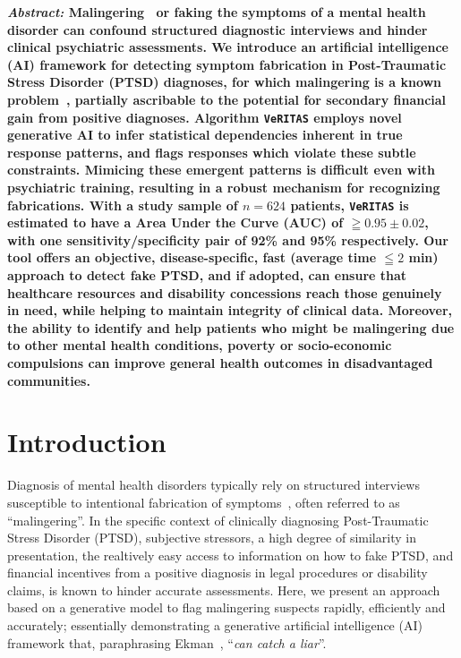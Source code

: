 \documentclass[onecolumn,10pt]{IEEEtran}
\def\vrts{\texttt{VeRITAS}\xspace}
\begin{document}
\maketitle


{\bf \sffamily \fontsize{10}{12}\selectfont \noindent   
  {\normalfont \itshape Abstract:} Malingering~\cite{Rogers1997,rogers2008clinical} or faking  the symptoms of a mental health disorder  can confound structured diagnostic interviews and hinder clinical psychiatric assessments.  We introduce an  artificial intelligence (AI) framework for detecting symptom fabrication in Post-Traumatic Stress Disorder (PTSD) diagnoses, for which malingering is a known problem~\cite{frueh2007us,taylor2007detection}, partially ascribable to the  potential for secondary financial gain from positive diagnoses.  Algorithm \vrts employs novel generative AI to infer statistical dependencies inherent in true response patterns, and flags  responses which violate these subtle  constraints. Mimicing these  emergent  patterns is difficult  even  with psychiatric training, resulting in a robust mechanism for recognizing fabrications. With a study sample of $n=624$ patients, \vrts is estimated to have a   Area Under the Curve (AUC) of $\geqq 0.95\pm 0.02$, with one sensitivity/specificity pair  of 92\% and 95\% respectively. Our tool   offers an  objective, disease-specific, fast (average time $\leqq 2$ min)  approach to detect fake  PTSD, and if adopted, can  ensure that healthcare resources and disability concessions reach  those genuinely in need,  while  helping to maintain  integrity of clinical data. Moreover, the ability to identify and help  patients who might be malingering due to other mental health conditions, poverty or   socio-economic compulsions can  improve general health outcomes  in disadvantaged communities.  
}



\vspace{10pt} 

\section*{Introduction}
Diagnosis of mental health disorders typically  rely  on structured interviews~\cite{ali2015multimodal} susceptible to  intentional fabrication of  symptoms~\cite{Rogers1997,rogers2008clinical}, often referred to as ``malingering''. In the specific context of clinically diagnosing Post-Traumatic Stress Disorder (PTSD),  subjective stressors, a high degree of similarity in presentation,  the realtively easy access to  information on  how to fake PTSD,  and financial  incentives from a positive diagnosis  in  legal procedures or   disability claims, is known to hinder   accurate   assessments. Here, we present an approach based on a  generative model to flag malingering suspects rapidly, efficiently and accurately; essentially demonstrating a generative artificial intelligence (AI) framework that, paraphrasing Ekman~\cite{Ekman1992},  ``\textit{can catch a liar}''. 
\end{document}
